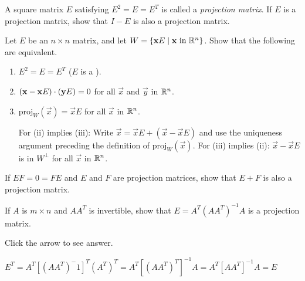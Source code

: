 \documentclass{ximera}
\begin{document}
\begin{problem}\label{prob:8_1_17.2}
A square matrix $E$ satisfying $E^2=E=E^T$ is called a \emph{projection matrix}.  If $E$ is a projection matrix, show that $I - E$ is also a projection matrix.
\end{problem}


\begin{problem}\label{prob:8_1_17.1}
\item Let $E$ be an $n \times n$ matrix, and let $W = \{\mathbf{x} E \mid \mathbf{x} \mbox{ in } \mathbb{R}^n\}$. Show that the following are equivalent.


\begin{enumerate}
\item $E^{2} = E = E^{T}$ ($E$ is a ).

\item $(\mathbf{x} - \mathbf{x}E) \cdot (\mathbf{y}E) = 0$ for all $\vec{x}$ and $\vec{y}$ in $\mathbb{R}^n$.

\item $\mbox{proj}_W(\vec{x}) = \vec{x}E$ for all $\vec{x}$ in $\mathbb{R}^n$.
\begin{hint}
For (ii) implies (iii): Write $\vec{x} = \vec{x}E + (\vec{x} - \vec{x}E)$ and use the uniqueness argument preceding the definition of $\mbox{proj}_W(\vec{x})$. For (iii) implies (ii): $\vec{x} - \vec{x}E$ is in $W^\perp$ for all $\vec{x}$ in $\mathbb{R}^n$.
\end{hint}
\end{enumerate}
\end{problem}



\begin{problem}\label{prob:8_1_17.3}
If $EF = 0 = FE$ and $E$ and $F$ are projection matrices, show that $E + F$ is also a projection matrix.

\end{problem}

\begin{problem}\label{prob:8_1_17.4}
If $A$ is $m \times n$ and $AA^{T}$ is invertible, show that $E = A^{T}(AA^{T})^{-1}A$ is a projection matrix.

Click the arrow to see answer.

\begin{expandable}{}{}
    $E^T = A^T[(AA^T)^-1]^T(A^T)^T  = A^T[(AA^T)^T]^{-1}A = A^T[AA^T]^{-1}A = E$
\end{expandable}

\end{problem}
\end{document}
